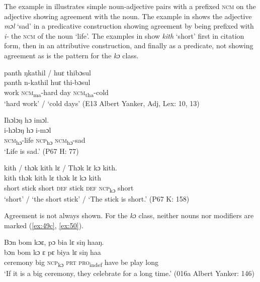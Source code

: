The example in  illustrates simple noun-adjective pairs with a prefixed \textsc{ncm} on the adjective showing agreement with the noun. The example in   shows the adjective \textit{mɔl} ‘sad' in a predicative construction showing agreement by being prefixed with \textit{i-} the \textsc{ncm} of the noun ‘life'. The examples in  show \textit{kith} ‘short' first in citation form, then in an attributive construction, and finally as a predicate, not showing agreement as is the pattern for the \textit{kɔ} class.

\ea%
    \label{ex:49}
    \ea \label{ex:49a} panth ŋkathil / huɛ thibɔsul\\
    \gll panth   n-kathil        huɛ   thi-bɔsul\\
    work    \textsc{ncm}\textsubscript{ma}{}-hard      day  \textsc{ncm}\textsubscript{tha}{}-cold\\
    \glt ‘hard work' / ‘cold days' (E13 Albert Yanker, Adj, Lex: 10, 13)
    
    \ex  \label{ex:49b}Ihɔlɔŋ hɔ imɔl.\\
    \gll i-hɔlɔŋ    hɔ      i-mɔl\\
    \textsc{ncm}\textsubscript{hɔ}{}-life  \textsc{ncp}\textsubscript{hɔ}    \textsc{ncm}\textsubscript{hɔ}{}-sad\\
    \glt ‘Life is sad.' (P67 H: 77)
    
    \ex \label{ex:49c} kith / thɔk kith lɛ / Thɔk lɛ kɔ kith.\\
    \gll kith    thɔk  kith  lɛ      thɔk  lɛ    kɔ       kith\\
    short    stick  short  \textsc{def}    stick   \textsc{def}  \textsc{ncp}\textsubscript{kɔ}   short\\
    \glt ‘short' / ‘the short stick' / ‘The stick is short.' (P67 K: 158)
    \z
    \z

Agreement is not always shown. For the \textit{kɔ} class, neither nouns nor modifiers are marked (\ref{ex:49c}, \ref{ex:50}).

\ea%
    \label{ex:50}
    Bɔn bom kɔɛ, pɔ bia lɛ siŋ haaŋ.\\
    \gll bɔn      bom  kɔ      ɛ    pɛ      biya  lɛ  siŋ    haa\\
    ceremony  big  \textsc{ncp}\textsubscript{kɔ}    \textsc{prt}  \textsc{pro}\textsubscript{indef}  have  be  play  long\\
    \glt ‘If it is a big ceremony, they celebrate for a long time.' (016a Albert Yanker: 146)
\z

